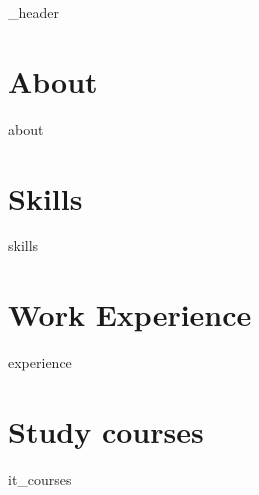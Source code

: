 \documentclass[line, letter,10pt]{article}
\author{Ilya Kazakov}
\begin{document}
{_header}
\vspace*{1pt}

\hline
\vspace*{10pt}

\section{About}\label{sec:about}
\vspace*{3pt}
{about}
\vspace*{10pt}

\section{Skills}\label{sec:skills}
\vspace*{3pt}
{skills}
\vspace*{10pt}

\section{Work Experience}\label{sec:work-experience}
\vspace*{3pt}
{experience}
\vspace*{10pt}

\section{Study courses}\label{sec:study-courses}
\vspace*{3pt}
{it_courses}
\vspace*{10pt}
\end{document}
